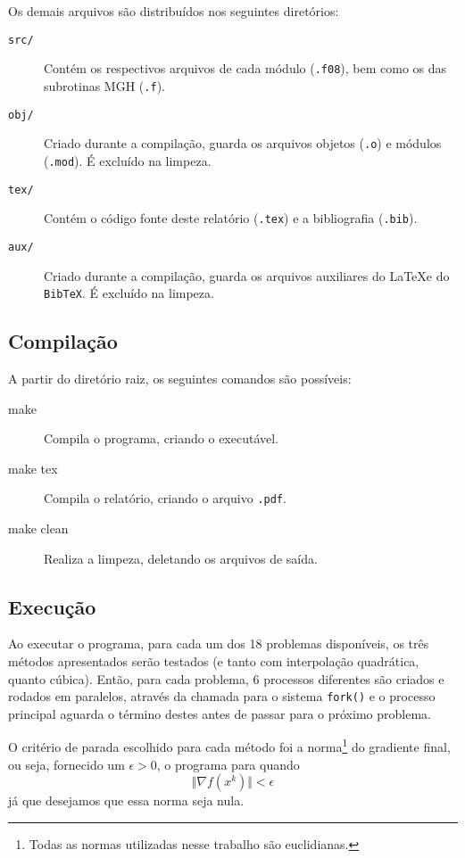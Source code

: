 \documentclass[a4paper,11pt]{article}
\begin{document}
            Os demais arquivos são distribuídos nos seguintes diretórios:
            \begin{description}
                \item[\texttt{src/}] Contém os respectivos arquivos de cada módulo (\texttt{.f08}), bem como os das subrotinas MGH (\texttt{.f}).
                \item[\texttt{obj/}] Criado durante a compilação, guarda os arquivos objetos (\texttt{.o}) e módulos (\texttt{.mod}). É excluído na limpeza.
                \item[\texttt{tex/}] Contém o código fonte deste relatório (\texttt{.tex}) e a bibliografia (\texttt{.bib}).
                \item[\texttt{aux/}] Criado durante a compilação, guarda os arquivos auxiliares do \LaTeX  e do \texttt{BibTeX}. É excluído na limpeza.
            \end{description}

        \subsection*{Compilação}
            A partir do diretório raiz, os seguintes comandos são possíveis:

            \begin{description}
                \item[make] Compila o programa, criando o executável.
                \item[make tex] Compila o relatório, criando o arquivo \texttt{.pdf}.
                \item[make clean] Realiza a limpeza, deletando os arquivos de saída.
            \end{description}

        \subsection*{Execução}
            Ao executar o programa, para cada um dos 18 problemas disponíveis, os três métodos apresentados serão testados (e tanto com interpolação quadrática, quanto cúbica).
            Então, para cada problema, 6 processos diferentes são criados e rodados em paralelos, através da chamada para o sistema \texttt{fork()} e o processo principal aguarda o término destes antes de passar para o próximo problema.

            O critério de parada escolhido para cada método foi a norma\footnote{Todas as normas utilizadas nesse trabalho são euclidianas.} do gradiente final, ou seja, fornecido um $\epsilon > 0$, o programa para quando
                $$ \Vert \nabla f(x^k) \Vert < \epsilon $$
            já que desejamos que essa norma seja nula.
\end{document}
